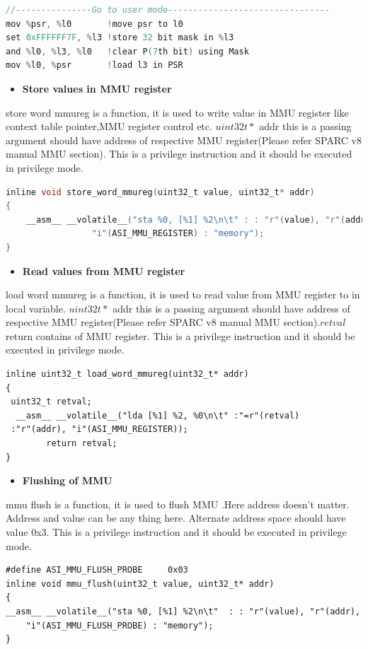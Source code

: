 \documentclass[12pt,a4paper]{article}
\begin{document}
\begin{lstlisting}[language=C]
//---------------Go to user mode--------------------------------
mov %psr, %l0 		!move psr to l0
set 0xFFFFFF7F, %l3	!store 32 bit mask in %l3
and %l0, %l3, %l0 	!clear P(7th bit) using Mask
mov %l0, %psr 		!load l3 in PSR
\end{lstlisting}

\begin{itemize}
\item \textbf{Store values in MMU register}
\end{itemize}
store word mmureg is a function, it is used to write value in MMU register like context table pointer,MMU register control etc. $uint32 t*$ addr this is a passing argument should have address of respective MMU register(Please refer SPARC v8 manual MMU section). This is a privilege instruction and  it should be executed in privilege mode.
\begin{lstlisting}[language=C]
inline void store_word_mmureg(uint32_t value, uint32_t* addr)
{
	__asm__ __volatile__("sta %0, [%1] %2\n\t" : : "r"(value), "r"(addr),
			     "i"(ASI_MMU_REGISTER) : "memory");
}
 \end{lstlisting}

\begin{itemize}
\item \textbf{Read values from MMU register}
\end{itemize}
load word mmureg is a function, it is used to read value from MMU register to in local variable. $uint32 t*$ addr this is a passing argument should have address of respective MMU register(Please refer SPARC v8 manual MMU section).$retval$ return contains of MMU register. This is a privilege instruction and  it should be executed in privilege mode.
\begin{lstlisting}
inline uint32_t load_word_mmureg(uint32_t* addr)
{
 uint32_t retval;
  __asm__ __volatile__("lda [%1] %2, %0\n\t" :"=r"(retval)
 :"r"(addr), "i"(ASI_MMU_REGISTER));
        return retval;
}
 \end{lstlisting}
\newpage
\begin{itemize}
\item \textbf{Flushing of MMU}
\end{itemize}
mmu flush is a function, it is used to flush MMU .Here address doesn't matter. Address and value can be any thing here. Alternate address space should have value 0x3. This is a privilege instruction and  it should be executed in privilege mode.
\begin{lstlisting}
#define ASI_MMU_FLUSH_PROBE	 	0x03
inline void mmu_flush(uint32_t value, uint32_t* addr)
{
__asm__ __volatile__("sta %0, [%1] %2\n\t"  : : "r"(value), "r"(addr), 
	"i"(ASI_MMU_FLUSH_PROBE) : "memory");
}
 \end{lstlisting}
\end{document}
